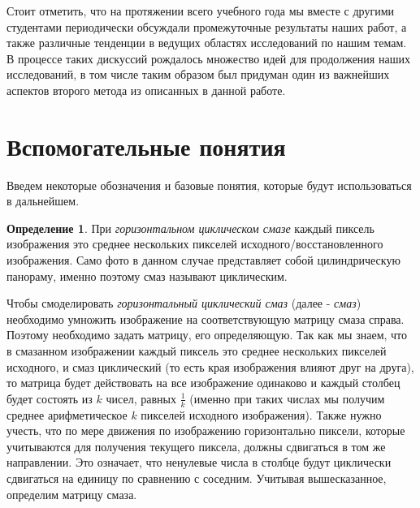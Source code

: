 \documentclass[a4paper]{article}
\theoremstyle{definition}
\newtheorem{definition}{Определение}[section]
\begin{document}
    Стоит отметить, что на протяжении всего учебного года мы вместе с другими студентами периодически обсуждали промежуточные результаты наших работ, а также различные тенденции в ведущих областях исследований по нашим темам. В процессе таких дискуссий рождалось множество идей для продолжения наших исследований, в том числе таким образом был придуман один из важнейших аспектов второго метода из описанных в данной работе.


    \newpage

    \section{Вспомогательные понятия}


    Введем некоторые обозначения и базовые понятия, которые будут использоваться в дальнейшем.


    \begin{definition}
    \label{blur}
    При \emph{горизонтальном циклическом смазе} каждый пиксель изображения это среднее нескольких пикселей исходного/восстановленного изображения. Само фото в данном случае представляет собой цилиндрическую панораму, именно поэтому смаз называют циклическим.
    \end{definition}


    Чтобы смоделировать \emph{горизонтальный циклический смаз} (далее - \emph{смаз}) необходимо умножить изображение на соответствующую матрицу смаза справа. Поэтому необходимо задать матрицу, его определяющую. Так как мы знаем, что в смазанном изображении каждый пиксель это среднее нескольких пикселей исходного, и смаз циклический (то есть края изображения влияют друг на друга), то матрица будет действовать на все изображение одинаково и каждый столбец будет состоять из $k$ чисел, равных $\frac{1}{k}$ (именно при таких числах мы получим среднее арифметическое $k$ пикселей исходного изображения). Также нужно учесть, что по мере движения по изображению горизонтально пиксели, которые учитываются для получения текущего пиксела, должны сдвигаться в том же направлении. Это означает, что ненулевые числа в столбце будут циклически сдвигаться на единицу по сравнению с соседним. Учитывая вышесказанное, определим матрицу смаза.
\end{document}
